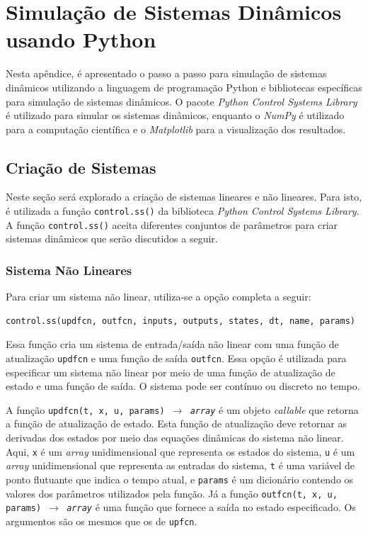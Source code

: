 \chapter{Simulação de Sistemas Dinâmicos usando Python} \label{apendice_a}


Nesta apêndice, é apresentado o passo a passo para simulação de sistemas dinâmicos utilizando a linguagem de programação Python e bibliotecas específicas para simulação de sistemas dinâmicos. O pacote \textit{Python Control Systems Library} é utilizado para simular os sistemas dinâmicos, enquanto o \textit{NumPy} é utilizado para a computação científica e o \textit{Matplotlib} para a visualização dos resultados.

\section{Criação de Sistemas}

Neste seção será explorado a criação de sistemas lineares e não lineares. Para isto, é utilizada a função \texttt{control.ss()} da biblioteca \textit{Python Control Systems Library}. A função \texttt{control.ss()} aceita diferentes conjuntos de parâmetros para criar sistemas dinâmicos que serão discutidos a seguir.

\subsection{Sistema Não Lineares}

Para criar um sistema não linear, utiliza-se a opção completa a seguir:

\begin{lstlisting}[language=Python]
  control.ss(updfcn, outfcn, inputs, outputs, states, dt, name, params)
\end{lstlisting}

Essa função cria um sistema de entrada/saída não linear com uma função de atualização \texttt{updfcn} e uma função de saída \texttt{outfcn}. Essa opção é utilizada para especificar um sistema não linear por meio de uma função de atualização de estado e uma função de saída. O sistema pode ser contínuo ou discreto no tempo.

A função \texttt{updfcn(t, x, u, params) $\rightarrow$ \textit{array}} é um objeto \textit{callable} que retorna a função de atualização de estado. Esta função de atualização deve retornar as derivadas dos estados por meio das equações dinâmicas do sistema não linear. Aqui, \texttt{x} é um \textit{array} unidimensional que representa os estados do sistema, \texttt{u} é um \textit{array} unidimensional que representa as entradas do sistema, \texttt{t} é uma variável de ponto flutuante que indica o tempo atual, e \texttt{params} é um dicionário contendo os valores dos parâmetros utilizados pela função. Já a função \texttt{outfcn(t, x, u, params) $\rightarrow$ \textit{array}} é uma função que fornece a saída no estado especificado. Os argumentos são os mesmos que os de \texttt{upfcn}.

